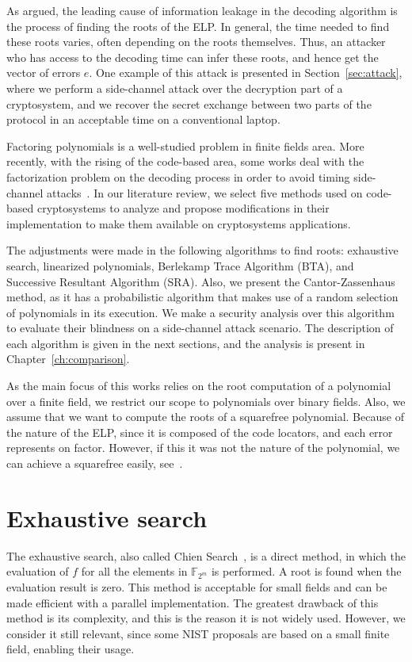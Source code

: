As argued, the leading cause of information leakage in the decoding algorithm is the process of finding the roots of the ELP. In general, the time needed to find these roots varies, often depending on the roots themselves. Thus, an attacker who has access to the decoding time can infer these roots, and hence get the vector of errors $e$. One example of this attack is presented in Section~\ref{sec:attack}, where we perform a side-channel attack over the decryption part of a cryptosystem, and we recover the secret exchange between two parts of the protocol in an acceptable time on a conventional laptop.

Factoring polynomials is a well-studied problem in finite fields area. More recently, with the rising of the code-based area, some works deal with the factorization problem on the decoding process in order to avoid timing side-channel attacks~\cite{shoufan2009timing, bucerzan2017improved}. In our literature review, we select five methods used on code-based cryptosystems to analyze and propose modifications in their implementation to make them available on cryptosystems applications.

The adjustments were made in the following algorithms to find roots: exhaustive search, linearized polynomials, Berlekamp Trace Algorithm (BTA), and Successive Resultant Algorithm (SRA). Also, we present the Cantor-Zassenhaus method, as it has a probabilistic algorithm that makes use of a random selection of polynomials in its execution. We make a security analysis over this algorithm to evaluate their blindness on a side-channel attack scenario. The description of each algorithm is given in the next sections, and the analysis is present in Chapter~\ref{ch:comparison}.

As the main focus of this works relies on the root computation of a polynomial over a finite field, we restrict our scope to polynomials over binary fields. Also, we assume that we want to compute the roots of a squarefree polynomial. Because of the nature of the ELP, since it is composed of the code locators, and each error represents on factor. However, if this it was not the nature of the polynomial, we can achieve a squarefree easily, see~\cite{von2001factoring}.

\section{Exhaustive search}
The exhaustive search, also called Chien Search~\cite{chien1964cyclic}, is a direct method, in which the evaluation of $f$ for all the elements in $\mathbb{F}_{2^m}$ is performed. A root is found when the evaluation result is zero. This method is acceptable for small fields and can be made efficient with a parallel implementation. The greatest drawback of this method is its complexity, and this is the reason it is not widely used. However, we consider it still relevant, since some NIST proposals are based on a small finite field, enabling their usage. 


